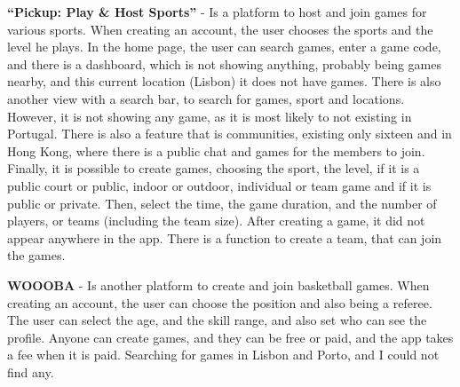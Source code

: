 \textbf{``Pickup: Play \& Host Sports''}\cite{pickup, pickup-app} - Is a platform to host and join games for various sports.
When creating an account, the user chooses the sports and the level he plays.
In the home page, the user can search games, enter a game code, and there is a dashboard, which is not showing anything, probably being games nearby, and this current location (Lisbon) it does not have games.
There is also another view with a search bar, to search for games, sport and locations.
However, it is not showing any game, as it is most likely to not existing in Portugal.
There is also a feature that is communities, existing only sixteen and in Hong Kong, where there is a public chat and games for the members to join.
Finally, it is possible to create games, choosing the sport, the level, if it is a public court or public, indoor or outdoor, individual or team game and if it is public or private.
Then, select the time, the game duration, and the number of players, or teams (including the team size).
After creating a game, it did not appear anywhere in the app.
There is a function to create a team, that can join the games.

\textbf{WOOOBA}\cite{woooba} - Is another platform to create and join basketball games.
When creating an account, the user can choose the position and also being a referee.
The user can select the age, and the skill range, and also set who can see the profile.
Anyone can create games, and they can be free or paid, and the app takes a fee when it is paid.
Searching for games in Lisbon and Porto, and I could not find any.

